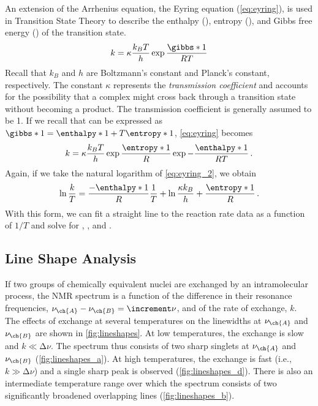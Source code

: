 An extension of the Arrhenius equation, the Eyring equation (\cref{eq:eyring}), is used in Transition State Theory to describe the enthalpy (), entropy (), and Gibbs free energy () of the transition state. 
\begin{equation}
  k = \kappa \frac{k_B T}{h} \exp{\frac{\gibbs*{1}}{RT}}
  \label{eq:eyring}
\end{equation}
Recall that \( k_B \) and \( h \) are Boltzmann's constant and Planck's constant, respectively. 
The constant \( \kappa \) represents the \emph{transmission coefficient} and accounts for the possibility that a complex might cross back through a transition state without becoming a product. 
The transmission coefficient is generally assumed to be \num{1}. 
If we recall that  can be expressed as \( \gibbs*{1} = \enthalpy*{1} + T \entropy*{1} \), \cref{eq:eyring} becomes 
\begin{equation}
  k = \kappa \frac{k_B T}{h} \exp{\frac{\entropy*{1}}{R}} \exp{-\frac{\enthalpy*{1}}{R T}} \, .
  \label{eq:eyring_2}
\end{equation}
Again, if we take the natural logarithm of \cref{eq:eyring_2}, we obtain
\begin{equation}
  \ln{\frac{k}{T}} = \frac{-\enthalpy*{1}}{R} \frac{1}{T} 
    + \ln{\frac{\kappa k_B}{h}} + \frac{\entropy*{1}}{R} \, .
  \label{eq:eyring_linear}
\end{equation}
With this form, we can fit a straight line to the reaction rate data as a function of \( 1/T \) and solve for , , and . 


\subsection{Line Shape Analysis} %
\label{sub:line_shape_analysis}

If two groups of chemically equivalent nuclei are exchanged by an intramolecular process, the NMR spectrum is a function of the difference in their resonance frequencies, \( \nu_{\ch{A}} - \nu_{\ch{B}} = \increment\nu \), and of the rate of exchange, \( k \). 
The effects of exchange at several temperatures on the linewidths at \( \nu_{\ch{A}} \) and \( \nu_{\ch{B}} \) are shown in \cref{fig:lineshapes}. 
At low temperatures, the exchange is slow and \( k \ll \increment\nu \). 
The spectrum thus consists of two sharp singlets at \( \nu_{\ch{A}} \) and \( \nu_{\ch{B}} \) (\cref{fig:lineshapes_a}). 
At high temperatures, the exchange is fast (i.e., \( k \gg \increment\nu \)) and a single sharp peak is observed (\cref{fig:lineshapes_d}). 
There is also an intermediate temperature range over which the spectrum consists of two significantly broadened overlapping lines (\cref{fig:lineshapes_b}).


